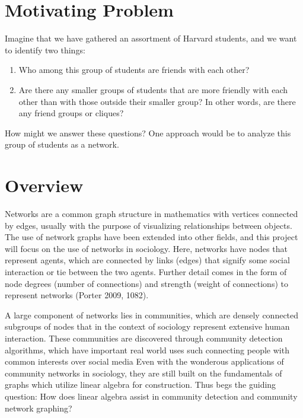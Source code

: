 \documentclass{article}
\begin{document}
\bigskip


 
 \bigskip 
 
\pagebreak 

\tableofcontents

\section{Motivating Problem}
Imagine that we have gathered an assortment of Harvard students, and we want to identify two things: 
\bigskip
\begin{enumerate}
  \item Who among this group of students are friends with each other?
  \item Are there any smaller groups of students that are more friendly with each other than with those outside their smaller group? 
        In other words, are there any friend groups or cliques?
\end{enumerate}
\bigskip

How might we answer these questions? One approach would be to analyze this group of students as a network.

\section{Overview}
Networks are a common graph structure in mathematics with vertices connected by edges, usually with the purpose of visualizing relationships between objects.
The use of network graphs have been extended into other fields, and this project will focus on the use of networks in sociology.
Here, networks have nodes that represent agents, which are connected by links (edges) that signify some social interaction or tie between the two agents.
Further detail comes in the form of node degrees (number of connections) and strength (weight of connections) to represent networks (Porter 2009, 1082). 
 
A large component of networks lies in communities, which are densely connected subgroups of nodes that in the context of sociology represent extensive human interaction.
These communities are discovered through community detection algorithms, which have important real world uses such connecting people with common interests over social media
Even with the wonderous applications of community networks in sociology, they are still built on the fundamentals of graphs which utilize linear algebra for construction. 
Thus begs the guiding question:
How does linear algebra assist in community detection and community network graphing?
\end{document}
